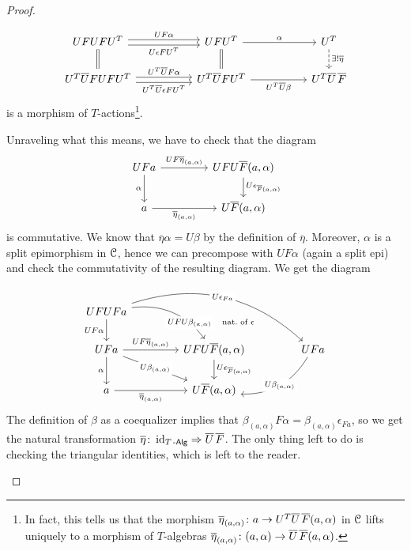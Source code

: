 \documentclass[a4paper,11pt,oneside,openany]{scrbook}
\begin{document}
\begin{proof}
\begin{enumerate}
	\[
	\begin{tikzcd}[column sep=1.8cm]
	UFUFU^T\arrow[r, shift left, "UF\alpha"] \arrow[r, shift right, "U\epsilon FU^T"']\arrow[d, equal]	& UFU^T\arrow[r, "\alpha"] \arrow[d, equal] & U^T \arrow[d, dashed, "\exists!\overline{\eta}"]\\
	U^T\overline{U}FUFU^T\arrow[r, shift left,  "U^T\overline{U}F\alpha"] \arrow[r, shift right, "U^T\overline{U}\epsilon FU^T"']&U^T\overline{U}FU^T\arrow[r, "U^T\overline{U}\beta"']& U^T\overline{U}\hspace{.5mm}\overline{F}
	\end{tikzcd}
	\]
	is a morphism of $T$-actions\footnote{In fact, this tells us that the morphism $\overline{\eta}_{(a,\alpha)}\colon a\to U^T\overline{U}\hspace{.5mm}\overline{F}(a,\alpha)$ in $\operatorname{\mathcal{C}}$ lifts uniquely to a morphism of $T$-algebras $\overline{\eta}_{(a,\alpha)}\colon(a,\alpha)\to\overline{U}\hspace{.5mm}\overline{F}(a,\alpha)$.}. 
	
	Unraveling what this means, we have to check that the diagram
	\[
	\begin{tikzcd}[column sep=1.5cm]
	UFa\ar[r, "UF\overline{\eta}_{(a,\alpha)}"]\ar[d,"\alpha"']
	& UFU\overline{F}(a,\alpha)\ar[d, "U\epsilon_{\overline{F}(a,\alpha)}"] \\
	a\ar[r, "\overline{\eta}_{(a,\alpha)}"']
	& U\overline{F}(a,\alpha)
	\end{tikzcd}
	\]	
	is commutative. We know that $\overline{\eta}\alpha=U\beta$ by the definition of $\overline{\eta}$. Moreover, $\alpha$ is a split epimorphism in $\operatorname{\mathcal{C}}$, hence we can precompose with $UF\alpha$ (again a split epi) and check the commutativity of the resulting diagram. We get the diagram
	\[
	\begin{tikzcd}[column sep=1.5cm]
	UFUFa\arrow[d, "UF\alpha"'] \arrow[rd, bend left, near end, "UFU\beta_{(a,\alpha)}"description] \arrow[rrd, bend left, "U\epsilon_{Fa}"description] &            & \ar[lld,draw=none, near start,"\hspace{-1.5cm}\text{nat.\ of\ } \epsilon" description]  \\
	UFa\arrow[d, "\alpha"'] \arrow[r, "UF\overline{\eta}_{(a,\alpha)}"] \arrow[rd, "U\beta_{(a,\alpha)}"description]                        & UFU\overline{F}(a,\alpha)  \arrow[d, "U\epsilon_{\overline{F}(a,\alpha)}"] &        UFa           \arrow[ld, bend left, "U\beta_{(a,\alpha)}"description]      \\
	a\arrow[r, "\overline{\eta}_{(a,\alpha)}"']                                             &     U\overline{F}(a,\alpha)       &                        
	\end{tikzcd}
	\]
	The definition of $\beta$ as a coequalizer implies that $\beta_{(a,\alpha)}F\alpha=\beta_{(a,\alpha)}\epsilon_{Fa}$, so we get the natural transformation $\overline{\eta}\colon\operatorname{id}_{T\operatorname{-\mathsf{Alg}}}\Rightarrow\overline{U}\hspace{.5mm}\overline{F}$. The only thing left to do is checking the triangular identities, which is left to the reader.
	

\end{enumerate}
\end{proof}
\end{document}
